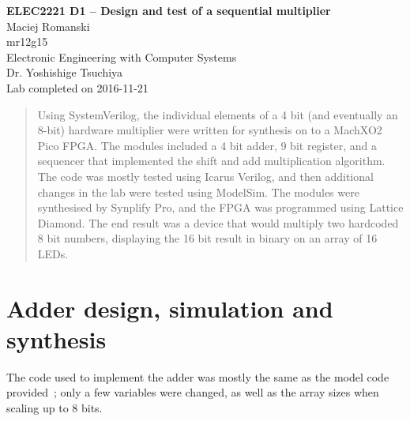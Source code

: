 \documentclass[a4paper,11pt]{article}
\begin{document}
  
\begin{center}
{\Large{\textbf{ELEC2221 D1 -- Design and test of a sequential multiplier}}} \\ [\baselineskip]
Maciej Romanski \\
mr12g15 \\
Electronic Engineering with Computer Systems \\
Dr. Yoshishige Tsuchiya \\
Lab completed on 2016-11-21
\end{center}

\begin{abstract}
Using SystemVerilog, the individual elements of a 4 bit (and eventually an 8-bit) hardware multiplier were written for synthesis on to a MachXO2 Pico FPGA. The modules included a 4 bit adder, 9 bit register, and a sequencer that implemented the shift and add multiplication algorithm. The code was mostly tested using Icarus Verilog, and then additional changes in the lab were tested using ModelSim. The modules were synthesised by Synplify Pro, and the FPGA was programmed using Lattice Diamond. The end result was a device that would multiply two hardcoded 8 bit numbers, displaying the 16 bit result in binary on an array of 16 LEDs.
\end{abstract}

\section{Adder design, simulation and synthesis}
The code used to implement the adder was mostly the same as the model code provided~\cite{addercode}; only a few variables were changed, as well as the array sizes when scaling up to 8 bits.
\end{document}
